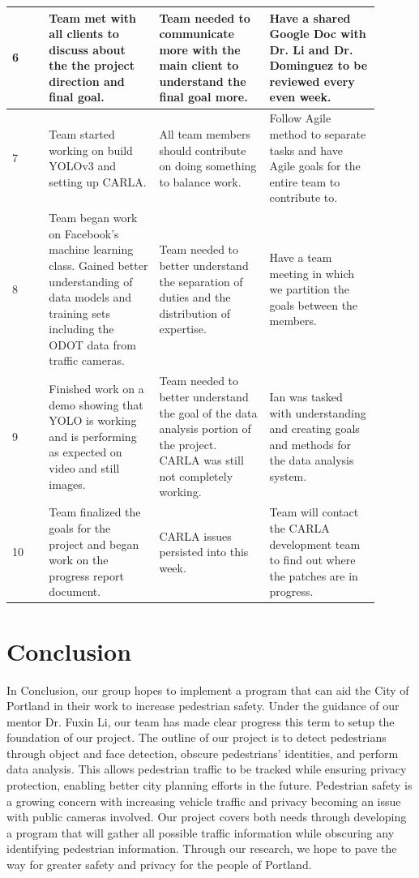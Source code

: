 \documentclass[onecolumn, draftclsnofoot,10pt, compsoc]{IEEEtran}
\begin{document}
\begin{center}
{\begin{tabular}{|l|p{0.3\linewidth}|p{0.3\linewidth}|p{0.3\linewidth}|}
 6 & Team met with all clients to discuss about the the project direction and final goal.& Team needed to communicate more with the main client to understand the final goal more.& Have a shared Google Doc with Dr. Li and Dr. Dominguez to be reviewed every even week.  \\
 \hline
 7 & Team started working on build YOLOv3 and setting up CARLA.& All team members should contribute on doing something to balance work.& Follow Agile method to separate tasks and have Agile goals for the entire team to contribute to.\\
 \hline
 8 & Team began work on Facebook's machine learning class. Gained better understanding of data models and training sets including the ODOT data from traffic cameras.& Team needed to better understand the separation of duties and the distribution of expertise. & Have a team meeting in which we partition the goals between the members. \\
 \hline
 9 & Finished work on a demo showing that YOLO is working and is performing as expected on video and still images. & Team needed to better understand the goal of the data analysis portion of the project. CARLA was still not completely working. & Ian was tasked with understanding and creating goals and methods for the data analysis system. \\
 \hline
 10 & Team finalized the goals for the project and began work on the progress report document. & CARLA issues persisted into this week. & Team will contact the CARLA development team to find out where the patches are in progress. \\
 \hline
 \end{tabular}
}
\end{center}
\pagebreak
\section{Conclusion}
In Conclusion, our group hopes to implement a program that can aid the City of Portland in their work to increase pedestrian safety. Under the guidance of our mentor Dr. Fuxin Li, our team has made clear progress this term to setup the foundation of our project. The outline of our project is to detect pedestrians through object and face detection, obscure pedestrians’ identities, and perform data analysis. This allows pedestrian traffic to be tracked while ensuring privacy protection, enabling better city planning efforts in the future. Pedestrian safety is a growing concern with increasing vehicle traffic and privacy becoming an issue with public cameras involved. Our project covers both needs through developing a program that will gather all possible traffic information while obscuring any identifying pedestrian information. Through our research, we hope to pave the way for greater safety and privacy for the people of Portland. 
\end{document}
